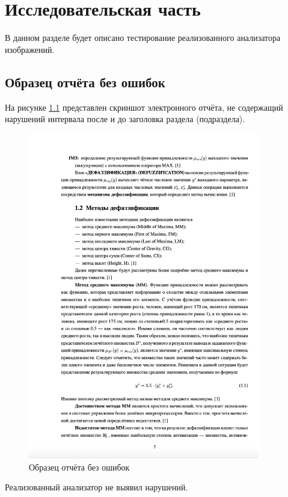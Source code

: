 \chapter{Исследовательская часть}

В данном разделе будет описано тестирование реализованного анализатора изображений.

\section{Образец отчёта без ошибок}
На рисунке \ref{img:pos} представлен скриншот электронного отчёта, не содержащий нарушений интервала после и до заголовка раздела (подраздела).

\begin{figure}
	\centering
	\includegraphics[width=0.9\textwidth]{images/pos.png}
	\caption{Образец отчёта без ошибок}
	\label{img:pos}
\end{figure}

Реализованный анализатор не выявил нарушений.

